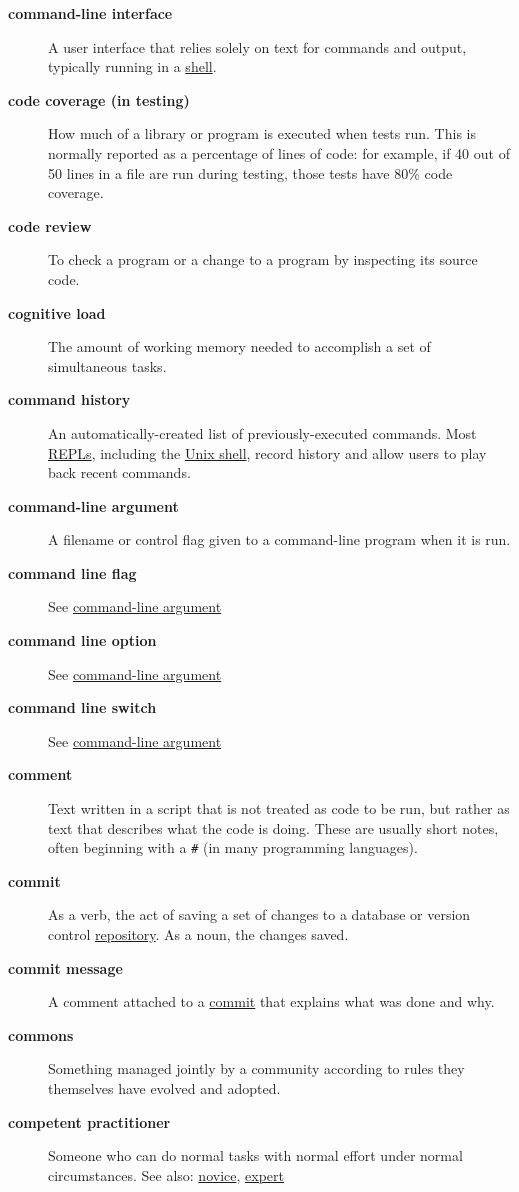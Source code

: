 \documentclass[
]{krantz}
\begin{document}
\begin{description}
\item[\textbf{command-line interface}]
A user interface that relies solely on text for commands and output, typically running in a \protect\hyperlink{shell}{shell}.
\item[\textbf{code coverage (in testing)}]
How much of a library or program is executed when tests run. This is normally reported as a percentage of lines of code: for example, if 40 out of 50 lines in a file are run during testing, those tests have 80\% code coverage.
\item[\textbf{code review}]
To check a program or a change to a program by inspecting its source code.
\item[\textbf{cognitive load}]
The amount of working memory needed to accomplish a set of simultaneous tasks.
\item[\textbf{command history}]
An automatically-created list of previously-executed commands. Most \protect\hyperlink{repl}{REPLs}, including the \protect\hyperlink{shell}{Unix shell}, record history and allow users to play back recent commands.
\item[\textbf{command-line argument}]
A filename or control flag given to a command-line program when it is run.
\item[\textbf{command line flag}]
See \protect\hyperlink{command_line_argument}{command-line argument}
\item[\textbf{command line option}]
See \protect\hyperlink{command_line_argument}{command-line argument}
\item[\textbf{command line switch}]
See \protect\hyperlink{command_line_argument}{command-line argument}
\item[\textbf{comment}]
Text written in a script that is not treated as code to be run, but rather as text that describes what the code is doing. These are usually short notes, often beginning with a \texttt{\#} (in many programming languages).
\item[\textbf{commit}]
As a verb, the act of saving a set of changes to a database or version control \protect\hyperlink{repository}{repository}. As a noun, the changes saved.
\item[\textbf{commit message}]
A comment attached to a \protect\hyperlink{commit}{commit} that explains what was done and why.
\item[\textbf{commons}]
Something managed jointly by a community according to rules they themselves have evolved and adopted.
\item[\textbf{competent practitioner}]
Someone who can do normal tasks with normal effort under normal circumstances. See also: \protect\hyperlink{novice}{novice}, \protect\hyperlink{expert}{expert}

\end{description}
\end{document}
